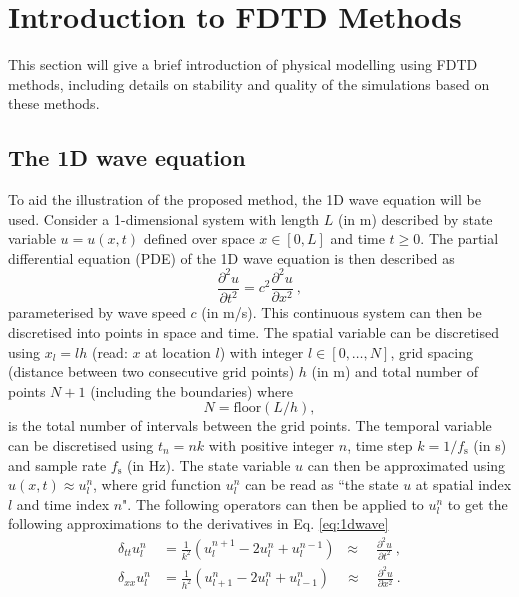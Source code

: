 \documentclass[dvipsnames, preprint]{JASA}
\begin{document}
\section{\label{sec:FDTD} Introduction to FDTD Methods}
This section will give a brief introduction of physical modelling using FDTD methods, including details on stability and quality of the simulations based on these methods.


\subsection{The 1D wave equation}
To aid the illustration of the proposed method, the 1D wave equation will be used. 
Consider a 1-dimensional system with length $L$ (in m) described by state variable $u = u(x, t)$ defined over space $x \in [0, L]$ and time $t \geq 0$. The partial differential equation (PDE) of the 1D wave equation is then described as
\begin{equation}\label{eq:1dwave}
    \frac{\partial^2 u}{\partial t^2}= c^2\frac{\partial^2 u}{\partial x^2}\ ,
\end{equation}
parameterised by wave speed $c$ (in m/s).
This continuous system can then be discretised into points in space and time. The spatial variable can be discretised using $x_l = lh$ (read: $x$ at location $l$) with integer $l \in [0, \hdots, N]$, grid spacing (distance between two consecutive grid points) $h$ (in m) and total number of points $N + 1$ (including the boundaries) where
\begin{equation}\label{eq:numberOfPoints}
    N = \text{floor}(L/h),
\end{equation}
is the total number of intervals between the grid points. The temporal variable can be discretised using $t_n = nk$ with positive integer $n$, time step $k = 1/f_\text{s}$ (in s) and sample rate $f_\text{s}$ (in Hz). The state variable $u$ can then be approximated using $u(x,t) \approx u_l^n$, where grid function $u_l^n$ can be read as ``the state $u$ at spatial index $l$ and time index $n$".
%
The following operators can then be applied to $u_l^n$ to get the following approximations to the derivatives in Eq. \eqref{eq:1dwave}
\begin{subequations}\label{eq:operators}
    \begin{align}
         \delta_{tt}u_l^n &= \frac{1}{k^2}\left(u_l^{n+1}-2u_l^n + u_l^{n-1}\right)\;\;\approx\quad\frac{\partial^2u}{\partial t^2}\label{eq:secondOrderTime}\ ,\\
         \delta_{xx}u_l^n &= \frac{1}{h^2}\left(u_{l+1}^n-2u_l^n + u_{l-1}^n\right)\quad\approx\quad \frac{\partial^2u}{\partial x^2}\ .\label{eq:secondOrderSpace}
    \end{align}
\end{subequations}
\end{document}
